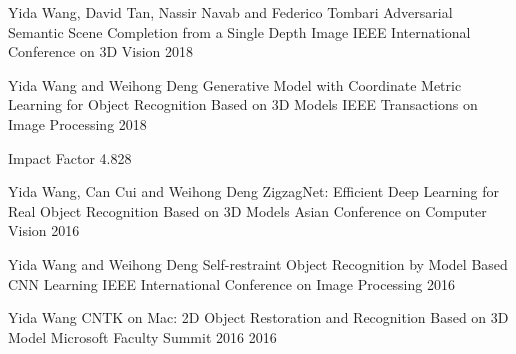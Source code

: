 


\begin{cventries}

\cventry
{Yida Wang, David Tan, Nassir Navab and Federico Tombari} %
{Adversarial Semantic Scene Completion from a Single Depth Image} %
{IEEE International Conference on 3D Vision} %
{2018} %
{ %
}

\cventry
{Yida Wang and Weihong Deng} %
{Generative Model with Coordinate Metric Learning for Object Recognition Based on 3D Models} %
{IEEE Transactions on Image Processing} %
{2018} %
{ %
\begin{cvitems}
\item {Impact Factor 4.828}
\end{cvitems}
}


\cventry
{Yida Wang, Can Cui and Weihong Deng} %
{ZigzagNet: Efficient Deep Learning for Real Object Recognition Based on 3D Models} %
{Asian Conference on Computer Vision} %
{2016} %
{ %
}


\cventry
{Yida Wang and Weihong Deng} %
{Self-restraint Object Recognition by Model Based CNN Learning} %
{IEEE International Conference on Image Processing} %
{2016} %
{ %
}


\cventry
{Yida Wang} %
{CNTK on Mac: 2D Object Restoration and Recognition Based on 3D Model} %
{Microsoft Faculty Summit 2016} %
{2016} %
{ %
}


\end{cventries}
